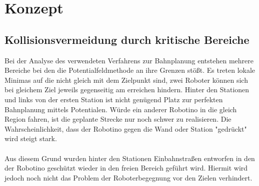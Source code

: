 \chapter{Konzept}
\label{cha:konzept}

\section{Kollisionsvermeidung durch kritische Bereiche}
Bei der Analyse des verwendeten Verfahrens zur Bahnplanung entstehen mehrere Bereiche bei den die Potentialfeldmethode an ihre Grenzen stößt. Es treten lokale Minimas auf die nicht gleich mit dem Zielpunkt sind, zwei Roboter können sich bei gleichem Ziel jeweils gegenseitig am erreichen hindern. Hinter den Stationen und links von der ersten Station ist nicht genügend Platz zur perfekten Bahnplanung mittels Potentialen. Würde ein anderer Robotino in die gleich Region fahren, ist die geplante Strecke nur noch schwer zu realisieren. Die Wahrscheinlichkeit, dass der Robotino gegen die Wand oder Station "gedrückt" wird steigt stark. \\
\\
Aus diesem Grund wurden hinter den Stationen Einbahnstraßen entworfen in den der Robotino geschützt wieder in den freien Bereich geführt wird. Hiermit wird jedoch noch nicht das Problem der Roboterbegegnung vor den Zielen verhindert.
